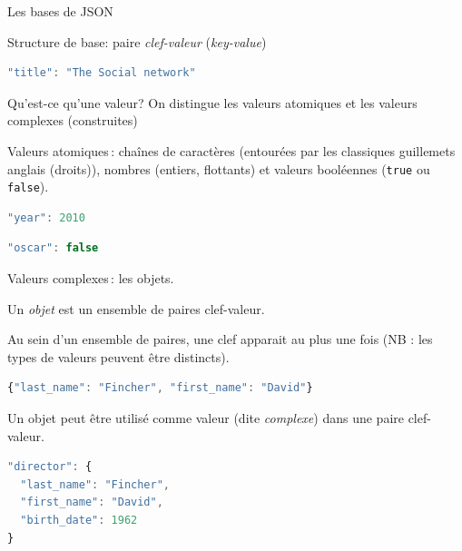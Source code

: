 \begin{frame}{Les bases de JSON}

Structure de base: paire  \textit{clef-valeur} (\textit{key-value})


\begin{lstlisting}[language=JavaScript,basicstyle=\small]
"title": "The Social network"
\end{lstlisting}

\bigskip

\alert{Qu'est-ce qu'une valeur?} On distingue les
 valeurs \alert{atomiques} et les valeurs \alert{complexes} (construites)

\medskip
Valeurs atomiques\,: cha\^ines de caractères (entourées 
par les classiques guillemets anglais (droits)), nombres (entiers, flottants) 
et valeurs booléennes (\texttt{true} ou \texttt{false}).

\begin{lstlisting}[language=JavaScript,basicstyle=\small]
"year": 2010
\end{lstlisting}


\begin{lstlisting}[language=JavaScript,basicstyle=\small]
"oscar": false
\end{lstlisting}

\framebreak

Valeurs complexes\,: les \alert{objets}.

\bigskip

Un \textit{objet} est un ensemble de paires clef-valeur.

\bigskip

Au sein d'un ensemble de paires, une clef apparait au plus une fois 
(NB : les types de valeurs peuvent être distincts).

\begin{lstlisting}[language=JavaScript,basicstyle=\small]
{"last_name": "Fincher", "first_name": "David"}
\end{lstlisting}

\bigskip

Un objet peut être utilisé comme valeur (dite \textit{complexe}) dans une paire clef-valeur.

\begin{lstlisting}[language=JavaScript,basicstyle=\small]
"director": { 
  "last_name": "Fincher",
  "first_name": "David", 
  "birth_date": 1962
}
\end{lstlisting}

\framebreak


\end{frame}
